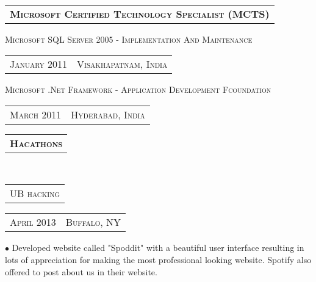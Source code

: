 \documentclass[10pt,a4paper,oneside]{article}
\begin{document}
    \vspace{4pt}\\
    \begin{tabular}{l}
        \textbf{\normalsize M\textsc{icrosoft} C\textsc{ertified} T\textsc{echnology} \textbf{S\textsc{pecialist} (MCTS)}}
    \end{tabular}
    \vspace{2pt}
    \begin{adjustwidth}{7pt}{0pt}
        {\small M\textsc{icrosoft} SQL S\textsc{erver} 2005 - I\textsc{mplementation} A\textsc{nd} M\textsc{aintenance}}
        \hspace{1.57in}
        \textcolor{light-gray}{
        \begin{tabular}{c|c}
            {\small J\textsc{anuary 2011}}
            &{\small V\textsc{isakhapatnam}, I\textsc{ndia}}
        \end{tabular}
    }
    \end{adjustwidth}
    \vspace{-12pt}
    \begin{adjustwidth}{7pt}{0pt}
        {\small M\textsc{icrosoft} .N\textsc{et} F\textsc{ramework} - A\textsc{pplication} D\textsc{evelopment} F\textsc{coundation}}
        \hspace{1.54in}
    \textcolor{light-gray}{
        \begin{tabular}{c|c}
            {\small M\textsc{arch 2011}}
            &{\small H\textsc{yderabad}, I\textsc{ndia}}
        \end{tabular}
    }
    \vspace{-10pt}
    \end{adjustwidth}
    \begin{tabular}{c}
        \textbf{\normalsize H\textsc{acathons}}
    \end{tabular}\\
    \begin{tabular}{c}
        {\small UB\textsc{ hacking}}
    \end{tabular}
    \hspace{5.35in}
    \textcolor{light-gray}{
        \begin{tabular}{c|c}
            {\small A\textsc{pril 2013}}
            &{\small B\textsc{uffalo}, NY}
        \end{tabular}
    }
    \vspace{-12pt}
    \begin{adjustwidth}{7pt}{0pt}
        {\footnotesize  $\bullet$ Developed website called "Spoddit" with a beautiful user interface resulting in lots of appreciation for making the most professional looking website. Spotify also  offered to post about us in their website.}\\
    \end{adjustwidth}
\end{document}
